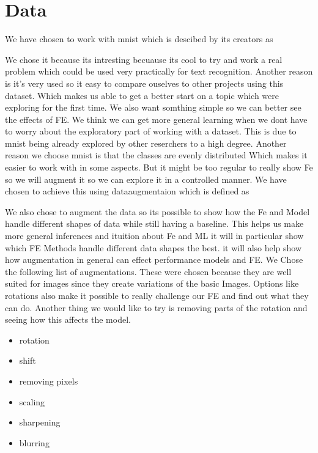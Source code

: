 \section{Data}

We have chosen to work with mnist which is descibed by its creators as

We chose it because its intresting becuause its cool to try and work a real problem which could be used very practically for text recognition. Another reason is it's very used so it easy to compare ouselves to other projects using this dataset. Which makes us able to get a better start on a topic which were exploring for the first time. We also want somthing simple so we can better see the effects of FE. We think we can get more general learning when we dont have to worry about the exploratory part of working with a dataset. This is due to mnist being already explored by other reserchers to a high degree. Another reason we choose mnist is that the classes are evenly distributed Which makes it easier to work with in some aspects. But it might be too regular to really show Fe so we will augment it so we can explore it in a controlled manner.
We have chosen to achieve this using dataaugmentaion which is defined as


We also chose to augment the data so its possible to show how the Fe and Model handle different shapes of data while still having a baseline. This helps us make more general inferences and ituition about Fe and ML it will in particular show which FE Methods handle different data shapes the best. it will also help show how augmentation in general can effect performance models  and FE.
We Chose the following list of augmentations.  These were chosen because they are well suited for images since they create variations of the basic Images. Options like rotations also make it possible to really challenge our FE and find out what they can do. Another thing we would like to try is removing parts of the rotation and seeing how this affects the model.

\begin{itemize}
    \item rotation
    \item shift
    \item removing pixels
    \item scaling
    \item sharpening
    \item blurring
  \end{itemize}

 



